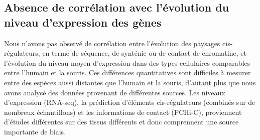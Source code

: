 \subsection{Absence de corrélation avec l’évolution du niveau d’expression des gènes}

Nous n’avons pas observé de corrélation entre l’évolution des paysages \gls{cis}-régulateurs, en terme de séquence, de synténie ou de contact de chromatine, et l’évolution du niveau moyen d’expression dans des types cellulaires comparables entre l’humain et la souris. Ces différences quantitatives sont difficiles à mesurer entre des espèces aussi distantes que l’humain et la souris, d’autant plus que nous avons analysé des données provenant de différentes sources. Les niveaux d’expression (RNA-seq), la prédiction d’éléments \gls{cis}-régulateurs (combinés sur de nombreux échantillons) et les informations de contact (\acrshort{PCHi-C}), proviennent d’études différentes sur des tissus différents et donc comprennent une source importante de biais. \\

